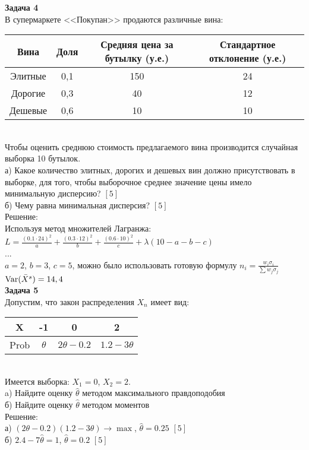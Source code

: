 \documentclass[pdftex,12pt,a4paper]{article}
\begin{document}
\textbf{Задача 4} \\ %
В супермаркете <<Покупан>> продаются различные вина: \\
\begin{tabular}{|c|c|c|c|}
  \hline
  Вина & Доля & Средняя цена за бутылку (у.е.) & Стандартное отклонение (у.е.) \\
  \hline
  Элитные & 0,1 & 150 & 24 \\
  Дорогие & 0,3 & 40 & 12 \\
  Дешевые & 0,6 & 10 & 10 \\
  \hline
\end{tabular} \\
Чтобы оценить среднюю стоимость предлагаемого вина производится
случайная выборка 10 бутылок. \\
а) Какое количество элитных, дорогих и дешевых вин должно
присутствовать в выборке, для того, чтобы выборочное среднее
значение цены имело минимальную дисперсию? $[5]$ \\
б) Чему равна минимальная дисперсия? $[5]$ \\
Решение: \\
Используя метод множителей Лагранжа: \\
$L=\frac{(0.1\cdot 24)^{2}}{a}+\frac{(0.3\cdot
12)^{2}}{b}+\frac{(0.6\cdot 10)^{2}}{c}+\lambda(10-a-b-c)$\\
... \\
$a=2$, $b=3$, $c=5$, можно было использовать готовую формулу
$n_{i}=\frac{w_{i}\sigma_{i}}{\sum w_{j}\sigma_{j}}$ \\
$\operatorname{Var}(\bar{X}^{s})=14,4$ \\



\textbf{Задача 5} \\ %
Допустим, что закон распределения $X_{n}$ имеет вид: \\
\begin{tabular}{|c|c|c|c|}
  \hline
  X & -1 & 0 & 2 \\
  \hline
  Prob & $\theta$ & $2\theta-0.2$ & $1.2-3\theta$ \\
  \hline
\end{tabular} \\
Имеется выборка: $X_{1}=0$, $X_{2}=2$. \\
a) Найдите оценку $\hat{\theta}$ методом максимального правдоподобия \\
б) Найдите оценку $\hat{\theta}$ методом моментов \\
Решение: \\
а) $(2\theta-0.2)(1.2-3\theta)\rightarrow\max$,
$\hat{\theta}=0.25$ $[5]$\\
б) $2.4-7\hat{\theta}=1$, $\hat{\theta}=0.2$ $[5]$\\
\end{document}
